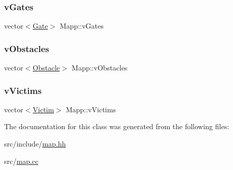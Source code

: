 \mbox{\label{class_mapp_ad33044227affb6fc91f1a795ca3fab4a}} 
\subsubsection{\texorpdfstring{vGates}{vGates}}
{\footnotesize\ttfamily vector$<$\mbox{\hyperlink{class_gate}{Gate}}$>$ Mapp\+::v\+Gates\hspace{0.3cm}{\ttfamily [protected]}}

\mbox{\label{class_mapp_adfc09e7e4750c47c7a3d2fe2f30241f8}} 
\subsubsection{\texorpdfstring{vObstacles}{vObstacles}}
{\footnotesize\ttfamily vector$<$\mbox{\hyperlink{class_obstacle}{Obstacle}}$>$ Mapp\+::v\+Obstacles\hspace{0.3cm}{\ttfamily [protected]}}

\mbox{\label{class_mapp_a3cd9951fd2f55c83de0c9441249b79db}} 
\subsubsection{\texorpdfstring{vVictims}{vVictims}}
{\footnotesize\ttfamily vector$<$\mbox{\hyperlink{class_victim}{Victim}}$>$ Mapp\+::v\+Victims\hspace{0.3cm}{\ttfamily [protected]}}



The documentation for this class was generated from the following files\+:\begin{DoxyCompactItemize}
\item 
src/include/\mbox{\hyperlink{map_8hh}{map.\+hh}}\item 
src/\mbox{\hyperlink{map_8cc}{map.\+cc}}\end{DoxyCompactItemize}
